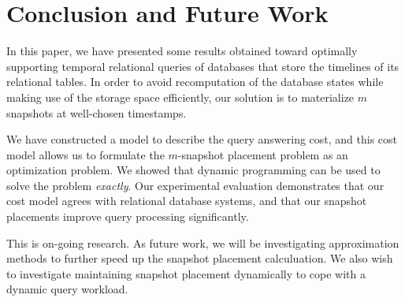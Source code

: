 \section{Conclusion and Future Work}

In this paper, we have presented some results obtained toward optimally
supporting temporal relational queries of databases that store the timelines of
its relational tables.  In order to avoid recomputation of the database states
while making use of the storage space efficiently, our solution is to
materialize $m$ snapshots at well-chosen timestamps.

We have constructed a model to describe the query answering cost, and this cost
model allows us to formulate the $m$-snapshot placement problem as an
optimization problem.  We showed that dynamic programming can be used to solve
the problem {\em exactly}.  Our experimental evaluation demonstrates that our
cost model agrees with relational database systems, and that our snapshot
placements improve query processing significantly.

This is on-going research. As future work, we will be investigating
approximation methods to further speed up the snapshot placement calculuation.
We also wish to investigate maintaining snapshot placement dynamically to cope
with a dynamic query workload.

